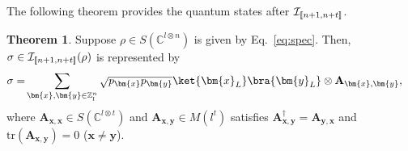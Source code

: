 \documentclass[reprint,amsmath,amssymb,aps,]{revtex4-2}
\theoremstyle{definition}
\newtheorem{theo}{Theorem}
\newcommand{\SET}[1]{\mathbb{#1}}
\newcommand{\Z}{\SET{Z}}
\newcommand{\C}{\SET{C}}
\newcommand{\1}{\mbox{1}\hspace{-0.25em}\mbox{l}}%
\newcommand{\setint}[1]{[\hspace{-0.5mm}[#1]\hspace{-0.5mm}]}
\newcommand{\mat}[1]{\mathbf{#1}}
\newcommand{\pure}[2]{\C^{#1 \otimes #2}}
\newcommand{\state}[2]{S(\pure{#1}{#2})}
\newcommand{\QU}[1]{\mathcal{#1}}
\begin{document}
The following theorem provides
the quantum states after $\QU{I}_{\setint{n+1,n+t}}$.
\begin{theo}
  \label{theo:ins_state}
  Suppose
  $\rho \in \state{l}{n}$ is given by Eq.~\eqref{eq:spec}.
  Then,
  $\sigma \in \QU{I}_{\setint{n+1,n+t}}(\rho)$ is represented by
  \begin{align}
    \sigma
    =&
    \sum_{\bm{x},\bm{y} \in \Z_{l}^{n}}
    \sqrt{ p_{\bm{x}} p_{\bm{y}} }
    \ket{\bm{x}_L}\bra{\bm{y}_L} \otimes \mat{A}_{\bm{x},\bm{y}},
  \end{align}
  where
  $\mat{A}_{\bm{x},\bm{x}} \in \state{l}{t}$ and
  $\mat{A}_{\bm{x},\bm{y}} \in M(l^t)$ satisfies
  $\mat{A}_{\bm{x},\bm{y}}^\dagger = \mat{A}_{\bm{y},\bm{x}}$ and
  $\text{tr}( \mat{A}_{\bm{x},\bm{y}} ) = 0$ ($\bm{x} \neq \bm{y}$).
\end{theo}
\end{document}
